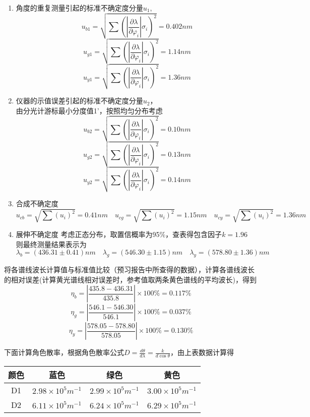 \documentclass[dvipsnames, svgnames,a4paper,11pt]{article}
\begin{document}
			\begin{enumerate}
					\item 	角度的重复测量引起的标准不确定度分量$u_1$,
							\[ u_{b1}=\sqrt{\sum\left(\left|\frac{\partial\lambda}{\partial\varphi_i}\right|\sigma_i\right)^2}=0.402nm \]
							\[ u_{g1}=\sqrt{\sum\left(\left|\frac{\partial\lambda}{\partial\varphi_i}\right|\sigma_i\right)^2}=1.14nm \]
							\[ u_{y1}=\sqrt{\sum{(\left|\frac{\partial\lambda}{\partial\varphi_i}\right|\sigma_i)}^2}=1.36nm \]
					
					\item 仪器的示值误差引起的标准不确定度分量$u_2$，\\
							由分光计游标最小分度值1’，按照均匀分布考虑
							\[ u_{b2}=\sqrt{\sum{(\left|\frac{\partial\lambda}{\partial\varphi_i}\right|\sigma_i)}^2}=0.10nm \]
							\[ u_{g2}=\sqrt{\sum\left(\left|\frac{\partial\lambda}{\partial\varphi_i}\right|\sigma_i\right)^2}=0.13nm \]
							\[ u_{y2}=\sqrt{\sum{(\left|\frac{\partial\lambda}{\partial\varphi_i}\right|\sigma_i)}^2}=0.14nm \]
					
					\item 合成不确定度
							\[ u_{cb}=\sqrt{\sum{(u_i)}^2}=0.41nm  \quad u_{cg}=\sqrt{\sum\left(u_i\right)^2}=1.15nm  \quad u_{cy}=\sqrt{\sum{(u_i)}^2}=1.36nm \]
					
					\item 展伸不确定度
							考虑正态分布，取置信概率为95\%，查表得包含因子$k=1.96$ \\
							则最终测量结果表示为
							\[ \lambda_b=(436.31\pm0.41)nm  \quad \lambda_g=\left(546.30\pm1.15\right)nm \quad  \lambda_y=(578.80\pm1.36)nm \]
					
				\end{enumerate}
		
			将各谱线波长计算值与标准值比较（预习报告中所查得的数据），计算各谱线波长的相对误差(计算黄光谱线相对误差时，参考值取两条黄色谱线的平均波长)，得到
			\[ \eta_b=\left|\frac{435.8-436.31}{435.8}\right|\times100\%=0.117\% \]
			\[ \eta_g=\left|\frac{546.1-546.30}{546.1}\right|\times100\%=0.037\% \]
			\[ \eta_y=\left|\frac{578.05-578.80}{578.05}\right|\times100\%=0.130\% \]
			
			下面计算角色散率，根据角色散率公式$D=\frac{d\theta}{d\lambda}=\frac{k}{d\cos{\theta}}$，由上表数据计算得
			
				\begin{center}
					\begin{tabular}{|c|c|c|c|}
						\hline
						\textbf{颜色} & \textbf{蓝色} & \textbf{绿色} & \textbf{黄色} \\
						\hline
						D1 & $2.98\times 10^{5} m^{-1}$ & $2.99\times 10^{5} m^{-1}$ & $3.00\times 10^{5} m^{-1}$ \\
						D2 & $6.11\times 10^{5} m^{-1}$ & $6.24\times 10^{5} m^{-1}$ & $6.29\times 10^{5} m^{-1}$ \\
						\hline
					\end{tabular}
				\end{center}
\end{document}

